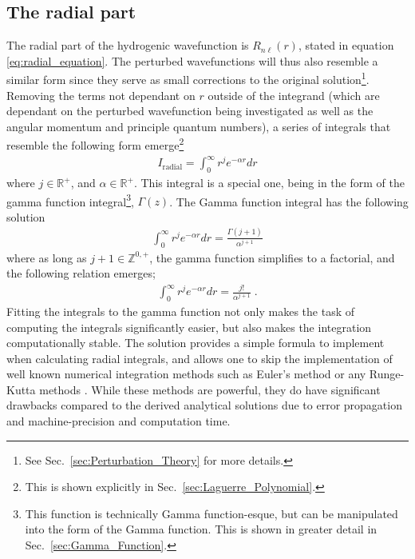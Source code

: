         \subsection{The radial part} \label{sec:The_Radial_Part}
            The radial part of the hydrogenic wavefunction is $R_{n\ell}(r)$, stated in equation \eqref{eq:radial_equation}. The perturbed wavefunctions will thus also resemble a similar form since they serve as small corrections to the original solution\footnote{See Sec.~\ref{sec:Perturbation_Theory} for more details.}. Removing the terms not dependant on $r$ outside of the integrand (which are dependant on the perturbed wavefunction being investigated as well as the angular momentum and principle quantum numbers), a series of integrals that resemble the following form emerge\footnote{This is shown explicitly in Sec.~\ref{sec:Laguerre_Polynomial}.}
            \begin{align}
                I_{\text{radial}} = \int_0^\infty r^j e^{-\alpha r} dr
            \end{align}
            \noindent where $j \in \mathbb{R^+}$, and $\alpha \in \mathbb{R^+}$. This integral is a special one, being in the form of the gamma function integral\footnote{This function is technically Gamma function-esque, but can be manipulated into the form of the Gamma function. This is shown in greater detail in Sec.~\ref{sec:Gamma_Function}.}, $\Gamma(z)$. The Gamma function integral has the following solution 
            \begin{align}
                \int_0^\infty r^j e^{-\alpha r} dr = \frac{\Gamma(j + 1)}{\alpha^{j + 1}}
            \end{align}
            \noindent where as long as $j + 1 \in \mathbb{Z}^{0,+}$, the gamma function simplifies to a factorial, and the following relation emerges;
            \begin{align}
                \int_0^\infty r^j e^{-\alpha r} dr = \frac{j!}{\alpha^{j + 1}}\;.
            \end{align}
            \noindent Fitting the integrals to the gamma function not only makes the task of computing the integrals significantly easier, but also makes the integration computationally stable. The solution provides a simple formula to implement when calculating radial integrals, and allows one to skip the implementation of well known numerical integration methods such as Euler's method or any Runge-Kutta methods \cite{Numerical_recipes}. While these methods are powerful, they do have significant drawbacks compared to the derived analytical solutions due to error propagation and machine-precision and computation time.\\
            
